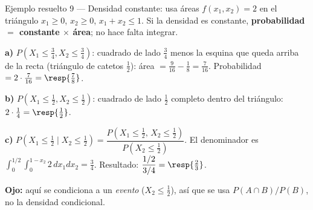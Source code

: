 \begin{ejemplo}{Ejemplo resuelto 9 --- Densidad constante: usa \'areas }
$f(x_1,x_2)=2$ en el tri\'angulo $x_1\ge0$, $x_2\ge0$, $x_1+x_2\le1$.
Si la densidad es constante, \textbf{probabilidad $=$ constante $\times$ \'area}; no hace falta integrar.

\textbf{a)} $P(X_1\le\tfrac34,X_2\le\tfrac34)$: cuadrado de lado $\tfrac34$ menos la esquina que queda arriba de la recta
(tri\'angulo de catetos $\tfrac12$): \'area $=\tfrac{9}{16}-\tfrac18=\tfrac{7}{16}$. Probabilidad $=2\cdot\tfrac{7}{16}=\resp{\tfrac78}$.

\textbf{b)} $P(X_1\le\tfrac12,X_2\le\tfrac12)$: cuadrado de lado $\tfrac12$ completo dentro del tri\'angulo: $2\cdot\tfrac14=\resp{\tfrac12}$.

\textbf{c)} $P(X_1\le\tfrac12\mid X_2\le\tfrac12)=\dfrac{P(X_1\le\frac12,\,X_2\le\frac12)}{P(X_2\le\frac12)}$.
El denominador es $\int_0^{1/2}\!\int_0^{1-x_2}2\,dx_1dx_2=\tfrac34$. Resultado: $\dfrac{1/2}{3/4}=\resp{\tfrac23}$.

\textbf{Ojo:} aqu\'i se condiciona a un \emph{evento} ($X_2\le\frac12$), as\'i que se usa $P(A\cap B)/P(B)$,
no la densidad condicional.
\end{ejemplo}

